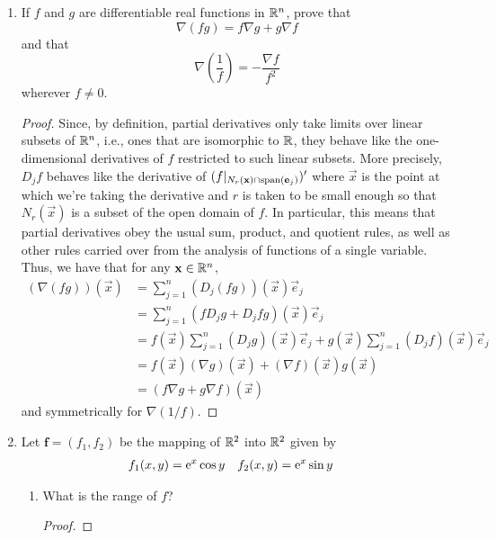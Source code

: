 \documentclass[../psets.tex]{subfiles}
\begin{document}
\begin{enumerate}[label={\textbf{\arabic*.}}]
\begin{proof}
    \end{proof}
    \item If $f$ and $g$ are differentiable real functions in $\R^n$, prove that
    \begin{equation*}
        \nabla(fg) = f\nabla g+g\nabla f
    \end{equation*}
    and that
    \begin{equation*}
        \nabla\left( \frac{1}{f} \right) = -\frac{\nabla f}{f^2}
    \end{equation*}
    wherever $f\neq 0$.
    \begin{proof}
        Since, by definition, partial derivatives only take limits over linear subsets of $\R^n$, i.e., ones that are isomorphic to $\R$, they behave like the one-dimensional derivatives of $f$ restricted to such linear subsets. More precisely, $D_jf$ behaves like the derivative of $(f|_{N_r(\vec{x})\cap\spn(\vec{e}_j)})'$ where $\vec{x}$ is the point at which we're taking the derivative and $r$ is taken to be small enough so that $N_r(\vec{x})$ is a subset of the open domain of $f$. In particular, this means that partial derivatives obey the usual sum, product, and quotient rules, as well as other rules carried over from the analysis of functions of a single variable. Thus, we have that for any $\vec{x}\in\R^n$,
        \begin{align*}
            (\nabla(fg))(\vec{x}) &= \sum_{j=1}^n(D_j(fg))(\vec{x})\vec{e}_j\\
            &= \sum_{j=1}^n(fD_jg+D_jfg)(\vec{x})\vec{e}_j\\
            &= f(\vec{x})\sum_{j=1}^n(D_jg)(\vec{x})\vec{e}_j+g(\vec{x})\sum_{j=1}^n(D_jf)(\vec{x})\vec{e}_j\\
            &= f(\vec{x})(\nabla g)(\vec{x})+(\nabla f)(\vec{x})g(\vec{x})\\
            &= (f\nabla g+g\nabla f)(\vec{x})
        \end{align*}
        and symmetrically for $\nabla(1/f)$.
    \end{proof}
    \setcounter{enumi}{16}
    \item Let $\mathbf{f}=(f_1,f_2)$ be the mapping of $\R^2$ into $\R^2$ given by
    \begin{align*}
        f_1(x,y) &= \e[x]\cos y&
        f_2(x,y) &= \e[x]\sin y
    \end{align*}
    \begin{enumerate}
        \item What is the range of $f$?
        \begin{proof}

\end{proof}
\end{enumerate}
\end{enumerate}
\end{document}
